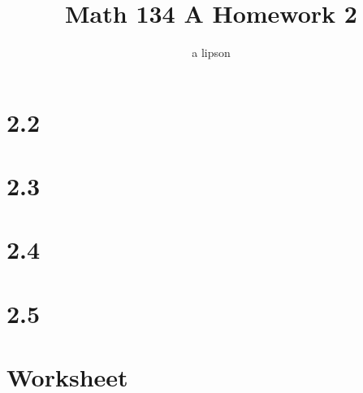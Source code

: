 \documentclass{article}
\title{Math 134 A Homework 2}
\author{a lipson}
\begin{document}
\maketitle

\section*{2.2}


\section*{2.3}


\section*{2.4}


\section*{2.5}


\section*{Worksheet}


\end{document}
